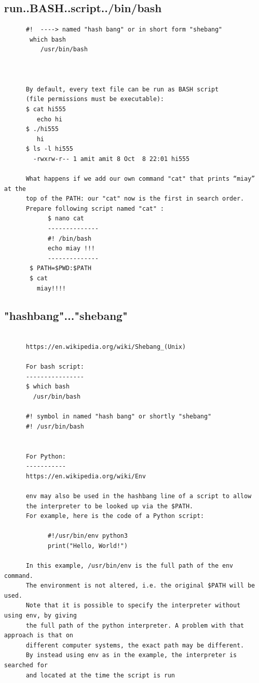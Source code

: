 \documentclass[a4paper,12pt]{article}
\begin{document}
\subsection{run..BASH..script../bin/bash }
\begin{verbatim}
      #!  ----> named "hash bang" or in short form "shebang"   
       which bash
          /usr/bin/bash
          
       
      
      By default, every text file can be run as BASH script 
      (file permissions must be executable):
      $ cat hi555
         echo hi
      $ ./hi555
         hi
      $ ls -l hi555
        -rwxrw-r-- 1 amit amit 8 Oct  8 22:01 hi555
      
      What happens if we add our own command "cat" that prints “miay” at the 
      top of the PATH: our "cat" now is the first in search order.
      Prepare following script named "cat" : 
            $ nano cat 
            --------------            
            #! /bin/bash
            echo miay !!!
            --------------
       $ PATH=$PWD:$PATH
       $ cat
         miay!!!!

\end{verbatim}

\subsection{"hashbang"..."shebang"    }
\begin{verbatim}
      
      https://en.wikipedia.org/wiki/Shebang_(Unix)
      
      For bash script:
      ---------------- 
      $ which bash      
        /usr/bin/bash
      
      #! symbol in named "hash bang" or shortly "shebang"
      #! /usr/bin/bash   


      For Python:
      -----------      
      https://en.wikipedia.org/wiki/Env
      
      env may also be used in the hashbang line of a script to allow
      the interpreter to be looked up via the $PATH.
      For example, here is the code of a Python script:

            #!/usr/bin/env python3
            print("Hello, World!")
            
      In this example, /usr/bin/env is the full path of the env command.
      The environment is not altered, i.e. the original $PATH will be used.
      Note that it is possible to specify the interpreter without using env, by giving             
      the full path of the python interpreter. A problem with that approach is that on 
      different computer systems, the exact path may be different. 
      By instead using env as in the example, the interpreter is searched for
      and located at the time the script is run
\end{verbatim}
\end{document}
